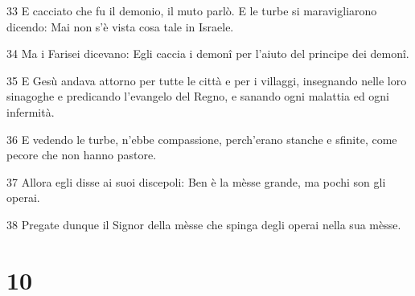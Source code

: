 \par 33 E cacciato che fu il demonio, il muto parlò. E le turbe si maravigliarono dicendo: Mai non s'è vista cosa tale in Israele.
\par 34 Ma i Farisei dicevano: Egli caccia i demonî per l'aiuto del principe dei demonî.
\par 35 E Gesù andava attorno per tutte le città e per i villaggi, insegnando nelle loro sinagoghe e predicando l'evangelo del Regno, e sanando ogni malattia ed ogni infermità.
\par 36 E vedendo le turbe, n'ebbe compassione, perch'erano stanche e sfinite, come pecore che non hanno pastore.
\par 37 Allora egli disse ai suoi discepoli: Ben è la mèsse grande, ma pochi son gli operai.
\par 38 Pregate dunque il Signor della mèsse che spinga degli operai nella sua mèsse.

\chapter{10}

